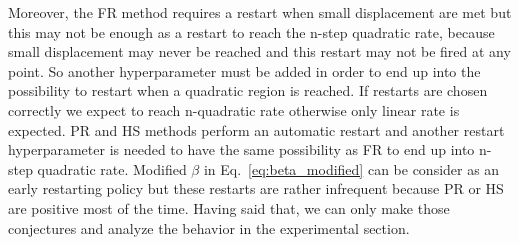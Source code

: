 \documentclass[11pt]{article}
\begin{document}
Moreover, the FR method requires a restart when small displacement are met but this may not be enough as a restart to reach the n-step quadratic rate, because small displacement may never be reached and this restart may not be fired at any point. So another hyperparameter must be added in order to end up into the possibility to restart when a quadratic region is reached. If restarts are chosen correctly we expect to reach n-quadratic rate otherwise only linear rate is expected. PR and HS methods perform an automatic restart and another restart hyperparameter is needed to have the same possibility as FR to end up into n-step quadratic rate. Modified $\beta$ in Eq.~\ref{eq:beta_modified} can be consider as an early restarting policy but these restarts are rather infrequent because PR or HS are positive most of the time. Having said that, we can only make those conjectures and analyze the behavior in the experimental section.\\



\end{document}

